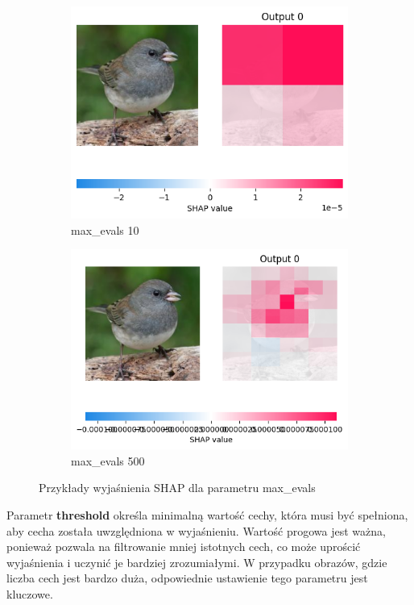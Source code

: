 \begin{figure}[h]
	\centering
	\begin{subfigure}[b]{0.45\textwidth}
		\includegraphics[width=.9\textwidth]{img/parameters/shap/max_evals_10}
		\caption{max\_evals 10}  \label{rys:parameters_lime_numsamples_5}
	\end{subfigure}
	\begin{subfigure}[b]{0.45\textwidth}
		\centering\includegraphics[width=.9\textwidth]{img/parameters/shap/max_evals_500}
		\caption{max\_evals 500}  \label{rys:parameters_lime_numsamples_1000}
	\end{subfigure}
	\caption{Przykłady wyjaśnienia SHAP dla parametru max\_evals}
\end{figure}
Parametr \textbf{threshold} określa minimalną wartość cechy, która musi być spełniona, aby cecha została uwzględniona w wyjaśnieniu.
Wartość progowa jest ważna, ponieważ pozwala na filtrowanie mniej istotnych cech, co może uprościć wyjaśnienia i uczynić je bardziej zrozumiałymi.
W przypadku obrazów, gdzie liczba cech jest bardzo duża, odpowiednie ustawienie tego parametru jest kluczowe.

